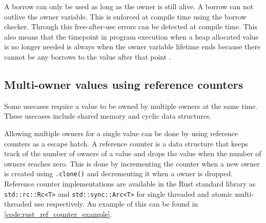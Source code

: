 A borrow can only be used as long as the owner is still alive.
A borrow can not outlive the owner variable.
This is enforced at compile time using the borrow checker.
Through this free-after-use errors can be detected at compile time.
This also means that the timepoint in program execution when a heap allocated
value is no longer needed is always when the owner variable lifetime ends
because there cannot be any borrows to the value after that point \cite[188]{rust_book_2019} \cite[2.4 Reference Lifetimes]{rust_borrow_formalism_2021} \cite{rust_effective_borrow_checker}.

\subsection{Multi-owner values using reference counters}

Some usecases require a value to be owned by multiple owners at the same time.
These usecases include shared memory and cyclic data structures.

Allowing multiple owners for a single value can be done by using reference counters as a escape hatch.
A reference counter is a data structure that keeps track of the number of owners
of a value and drops the value when the number of owners reaches zero.
This is done by incrementing the counter when a new owner is created using \texttt{.clone()}
and decrementing it when a owner is dropped.
Reference counter implementations are available in the Rust standard library
as \texttt{std::rc::Rc<T>} \cite[320-323]{rust_book_2019} and \texttt{std::sync::Arc<T>} \cite[361]{rust_book_2019} for single threaded and atomic
multi-threaded use respectively.
An example of this can be found in \autoref{code:rust_ref_counter_example}.

